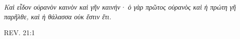 \clearpage
\thispagestyle{empty}
\null\vfill
\settowidth{}
\begin{center}
\parbox{\longest}{%
  \raggedright{\huge\itshape%
    Καὶ εἶδον οὐρανὸν καινὸν καὶ γῆν καινήν· ὁ γὰρ πρῶτος οὐρανὸς καὶ ἡ πρώτη γῆ παρῆλθε,  καὶ ἡ θάλασσα οὐκ ἔστιν ἔτι. \par\bigskip
  }
  \raggedleft\Large\MakeUppercase{Rev. 21:1}\par%
}
\vfill\vfill
\clearpage\newpage
\end{center}
\newpage